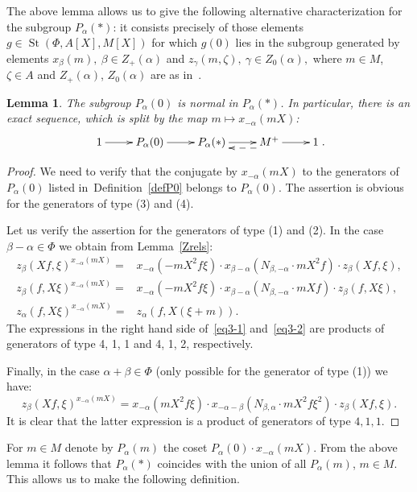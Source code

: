 \documentclass[oneside, 8pt]{amsart}
\newtheorem{lemma}{Lemma}
\theoremstyle{remark}
\theoremstyle{definition}
\DeclareMathOperator{\St}{St}
\numberwithin{equation}{section}
\begin{document}
The above lemma allows us to give the following alternative characterization for the subgroup $P_\alpha(*)$:
 it consists precisely of those elements $g \in \St(\Phi, A[X], M[X])$ for which $g(0)$ lies in the subgroup generated by
 elements $x_{\beta}(m),\ \beta \in Z_+(\alpha)$ and $z_{\gamma}(m, \zeta),\ \gamma \in Z_0(\alpha),$ where $m \in M$, $\zeta \in A$ 
 and $Z_+(\alpha)$, $Z_0(\alpha)$ are as in~\cite[Proposition~5.7]{St71}.
   
\begin{lemma}\label{P0_normal} The subgroup $P_\alpha(0)$ is normal in $P_\alpha(*)$. In particular, there is an exact sequence, which is split by the map $m \mapsto x_{-\alpha}(mX)$:
\[\xymatrix{1 \ar[r] & P_\alpha(0) \ar[r] & P_\alpha(*) \ar[r] & M^+ \ar@<5pt>@{-->}[l] \ar[r] & 1}.\]
\end{lemma}
\begin{proof} We need to verify that the conjugate by $x_{-\alpha}(mX)$ to the generators of $P_\alpha(0)$ listed in~Definition~\ref{defP0} belongs to $P_\alpha(0)$.
The assertion is obvious for the generators of type (3) and (4).

Let us verify the assertion for the generators of type (1) and (2). In the case $\beta - \alpha \in \Phi$ we obtain from Lemma~\ref{Zrels}:
\begin{align} z_{\beta}(Xf, \xi) ^ {x_{-\alpha}(mX)} = & x_{-\alpha} (- mX^2f\xi) \cdot x_{\beta-\alpha} (N_{\beta, -\alpha}\cdot mX^2f) \cdot z_{\beta}(Xf, \xi), \label{eq3-1} \\
  z_{\beta}(f, X\xi) ^ {x_{-\alpha}(mX)} = & x_{-\alpha} (- mX^2f\xi ) \cdot x_{\beta-\alpha} (N_{\beta, -\alpha}\cdot mXf) \cdot z_{\beta}(f, X\xi), \label{eq3-2} \\
  z_{\alpha}(f, X\xi) ^ {x_{-\alpha}(mX)} = & z_{\alpha}(f, X(\xi + m)). \end{align}
The expressions in the right hand side of~\eqref{eq3-1} and~\eqref{eq3-2} are products of generators of type 4, 1, 1 and 4, 1, 2, respectively.  

Finally, in the case $\alpha + \beta \in \Phi$ (only possible for the generator of type (1)) we have:
\[ z_{\beta}(Xf, \xi) ^ {x_{-\alpha}(mX)} = x_{-\alpha} (mX^2f\xi ) \cdot x_{-\alpha-\beta} (N_{\beta,\alpha}\cdot mX^2f\xi^2) \cdot z_{\beta}(Xf, \xi). \]
It is clear that the latter expression is a product of generators of type $4, 1, 1$.
\end{proof}

For $m \in M$ denote by $P_\alpha(m)$ the coset $P_\alpha(0) \cdot x_{-\alpha}(mX)$.
From the above lemma it follows that $P_\alpha(*)$ coincides with the union of all $P_\alpha(m)$, $m\in M$. This allows us to make the following definition. 
\end{document}
